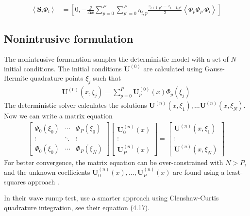 \documentclass{article}
\newcommand{\Ensemble}[1]{\left\langle #1 \right\rangle}
\newcommand{\vect}{\mathbf}
\begin{document}
\begin{align}
	\Ensemble{\vect{S}_i \Phi_l} &=
	\left[0, -\frac{g}{\Delta x}
	\sum_{p=0}^P \sum_{p'=0}^P
	\eta_{i,p} \frac{z_{i+1,p'} - z_{i-1,p'}}{2}
	\Ensemble{\Phi_p \Phi_{p'} \Phi_l}
	\right]
\end{align}

\subsection*{Nonintrusive formulation}

The nonintrusive formulation samples the deterministic model with a set of $N$ initial conditions.
The initial conditions $\vect{U}^{(0)}$ are calculated using Gauss-Hermite quadrature points $\xi_j$ such that
\begin{align}
	\vect{U}^{(0)}(x, \xi_j) = \sum_{p=0}^P \vect{U}_p^{(0)}(x) \Phi_p(\xi_j)
\end{align}
The deterministic solver calculates the solutions $\vect{U}^{(n)}(x, \xi_1), \ldots \vect{U}^{(n)}(x, \xi_N)$.
Now we can write a matrix equation
\begin{align}
	\begin{bmatrix}
		\Phi_0(\xi_0) & \cdots & \Phi_P(\xi_0) \\
		\vdots & \ddots & \vdots \\
		\Phi_0(\xi_0) & \cdots & \Phi_P(\xi_N)
	\end{bmatrix}
	\begin{bmatrix}
		\vect{U}_0^{(n)}(x) \\
		\vdots \\
		\vect{U}_P^{(n)}(x)
	\end{bmatrix}
	=
	\begin{bmatrix}
		\vect{U}^{(n)}(x, \xi_1) \\
		\vdots \\
		\vect{U}^{(n)}(x, \xi_N)
	\end{bmatrix}
\end{align}
For better convergence, the matrix equation can be over-constrained with $N > P$, and the unknown coefficients $\vect{U}_0^{(n)}(x), \ldots, \vect{U}_P^{(n)}(x)$ are found using a least-squares approach \citep{hosder2007}.

In their wave runup test, \citet{ge2009} use a smarter approach using Clenshaw-Curtis quadrature integration, see their equation (4.17).



\end{document}
